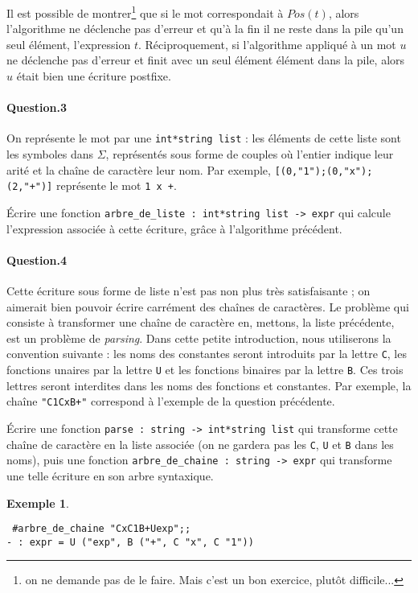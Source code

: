 \documentclass[10pt,a4paper]{article}
\theoremstyle{definition}
\newtheorem*{Ex}{Exemple}
\begin{document}
Il est possible de montrer\footnote{on ne demande pas de le faire. Mais c'est 
un bon exercice, plutôt difficile...} que si le mot 
correspondait à $Pos(t)$, alors l'algorithme ne déclenche pas d'erreur et qu'à la
fin il ne reste dans la pile qu'un seul élément, l'expression $t$. Réciproquement, si 
l'algorithme appliqué à un mot $u$ ne déclenche pas d'erreur et finit avec un 
seul élément élément dans la pile, alors $u$ était bien une écriture postfixe.

\paragraph{Question.3} On représente le mot par une \texttt{int*string list} :
les éléments de cette liste sont les symboles dans $\Sigma$, représentés sous
forme de couples où l'entier indique leur arité et la chaîne de caractère leur
nom. Par exemple, \texttt{[(0,"1");(0,"x");(2,"+")]} représente le mot \texttt{1 x +}.

Écrire une fonction \texttt{arbre\_de\_liste : int*string list -> expr} qui 
calcule l'expression associée à cette écriture, grâce à l'algorithme précédent.

\paragraph{Question.4} Cette écriture sous forme de liste n'est pas non plus
très satisfaisante ; on aimerait bien pouvoir écrire carrément des chaînes de 
caractères. Le problème qui consiste à transformer une chaîne de caractère
en, mettons, la liste précédente, est un problème de \textit{parsing}. Dans cette
petite introduction, nous utiliserons la convention suivante : les noms des
constantes seront introduits par la lettre \texttt{C}, les fonctions unaires
par la lettre \texttt{U} et les fonctions binaires par la lettre \texttt{B}. Ces
trois lettres seront interdites dans les noms des fonctions et constantes.
Par exemple, la chaîne \texttt{"C1CxB+"} correspond à l'exemple de la question
précédente.

Écrire une fonction \texttt{parse : string -> int*string list} qui transforme
cette chaîne de caractère en la liste associée (on ne gardera pas les \texttt{C},
\texttt{U} et \texttt{B} dans les noms), puis une fonction 
\texttt{arbre\_de\_chaine : string -> expr} qui transforme une telle écriture en
son arbre syntaxique.
\begin{Ex}
\begin{verbatim} #arbre_de_chaine "CxC1B+Uexp";;
- : expr = U ("exp", B ("+", C "x", C "1"))\end{verbatim}
\end{Ex}
\end{document}
